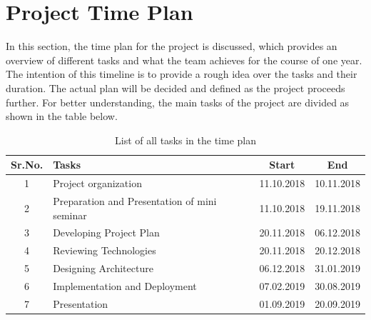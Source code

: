 \chapter{Project Time Plan}
\label{ch:Project Time Plan}

In this section, the time plan for the project is discussed, which provides an overview of different tasks and what the team achieves for the course of one year. The intention of this timeline is to provide a rough idea over the tasks and their duration. The actual plan will be decided and defined as the project proceeds further. For better understanding, the main tasks of the project are divided as shown in the table below.

\begin{table} [h]
\centering
	\begin{tabular}{|c|l|c|c|}
	\hline
		Sr.No. & Tasks & Start & End\\
		\hline
		1 &	Project organization & 11.10.2018 &	10.11.2018\\
		\hline
		2 &	Preparation and Presentation of mini seminar & 11.10.2018 &	19.11.2018\\
		\hline
		3 &	Developing Project Plan & 20.11.2018 & 06.12.2018\\
		\hline
		4 &	Reviewing Technologies & 20.11.2018 & 20.12.2018\\
		\hline
		5 &	Designing Architecture &	06.12.2018 & 31.01.2019\\
		\hline
		6 & Implementation and Deployment &	07.02.2019 & 30.08.2019\\
		\hline
		7 & Presentation &	01.09.2019 & 20.09.2019\\
		\hline
	\end{tabular}
\caption{List of all tasks in the time plan}
\end{table}

